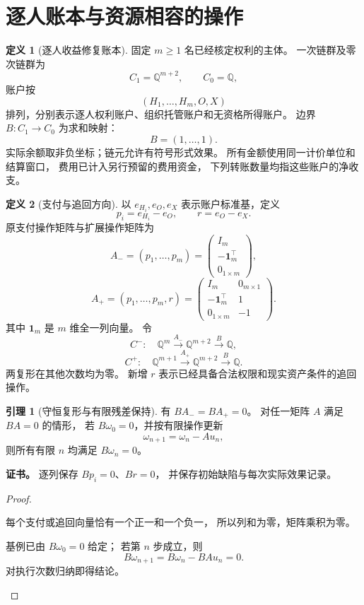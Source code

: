 \documentclass[UTF8,12pt,a4paper,openany,fontset=none,zihao=false]{ctexrep}
\theoremstyle{definition}
\newtheorem{definition}{定义}[chapter]
\newtheorem{lemma}{引理}[chapter]
\newenvironment{certificate}{\par\noindent\textbf{证书。}\ignorespaces}{\par}
\newcommand{\1}{\mathbf 1}
\begin{document}
\section{逐人账本与资源相容的操作}
\begin{definition}[逐人收益修复账本]
\label{r:ledger}
固定 \(m\ge1\) 名已经核定权利的主体。
一次链群及零次链群为
\[
C_1=\mathbb Q^{m+2},\qquad C_0=\mathbb Q,
\]
账户按
\[
(H_1,\ldots,H_m,O,X)
\]
排列，分别表示逐人权利账户、组织托管账户和无资格所得账户。
边界 \(B:C_1\to C_0\) 为求和映射：
\[
B=(1,\ldots,1).
\]
实际余额取非负坐标；链元允许有符号形式效果。
所有金额使用同一计价单位和结算窗口，
费用已计入另行预留的费用资金，
下列转账数量均指这些账户的净收支。
\end{definition}
\begin{definition}[支付与追回方向]
\label{r:directions}
以 \(e_{H_i},e_O,e_X\) 表示账户标准基，定义
\[
p_i=e_{H_i}-e_O,\qquad r=e_O-e_X.
\]
原支付操作矩阵与扩展操作矩阵为
\[
A_-=(p_1,\ldots,p_m)
=\begin{pmatrix}
I_m\\ -\mathbf{1}_m^\top\\ 0_{1\times m}
\end{pmatrix},
\]
\[
A_+=(p_1,\ldots,p_m,r)
=\begin{pmatrix}
I_m&0_{m\times1}\\
-\mathbf{1}_m^\top&1\\
0_{1\times m}&-1
\end{pmatrix}.
\]
其中 \(\mathbf{1}_m\) 是 \(m\) 维全一列向量。
令
\[
C^-:\quad\mathbb Q^m\xrightarrow{A_-}
\mathbb Q^{m+2}\xrightarrow{B}\mathbb Q,
\]
\[
C^+:\quad\mathbb Q^{m+1}\xrightarrow{A_+}
\mathbb Q^{m+2}\xrightarrow{B}\mathbb Q.
\]
两复形在其他次数均为零。
新增 \(r\) 表示已经具备合法权限和现实资产条件的追回操作。
\end{definition}
\begin{lemma}[守恒复形与有限残差保持]
\label{r:balance}
有 \(BA_-=BA_+=0\)。
对任一矩阵 \(A\) 满足 \(BA=0\) 的情形，
若 \(B\omega_0=0\)，并按有限操作更新
\[
\omega_{n+1}=\omega_n-Au_n,
\]
则所有有限 \(n\) 均满足 \(B\omega_n=0\)。
\end{lemma}
\begin{certificate}
逐列保存 \(Bp_i=0\)、\(Br=0\)，
并保存初始缺陷与每次实际效果记录。
\end{certificate}
\begin{proof}
\begin{semanticsteps}
\item 每个支付或追回向量恰有一个正一和一个负一，
所以列和为零，矩阵乘积为零。
\item 基例已由 \(B\omega_0=0\) 给定；
若第 \(n\) 步成立，则
\[
B\omega_{n+1}=B\omega_n-BAu_n=0.
\]
对执行次数归纳即得结论。
\end{semanticsteps}
\end{proof}
\end{document}
